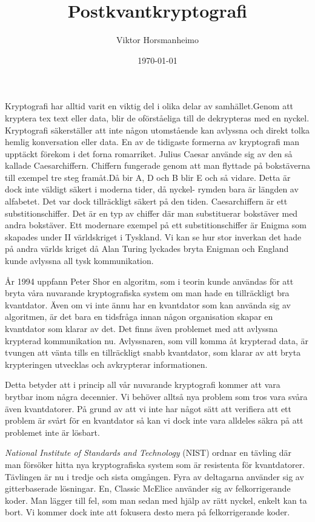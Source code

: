 \documentclass{paper}
\title{Postkvantkryptografi}
\author{Viktor Horsmanheimo}
\date{\today}
\begin{document}
\maketitle

Kryptografi har alltid varit en viktig del i olika delar av samhället.Genom att
kryptera tex text eller data, blir de oförståeliga till de dekrypteras med en
nyckel. Kryptografi säkerställer att inte någon utomstående kan avlyssna och
direkt tolka hemlig konversation eller data. En av de tidigaste formerna av
kryptografi man upptäckt förekom i det forna romarriket. Julius Caesar använde
sig av den så kallade Caesarchiffern. Chiffern fungerade genom att man flyttade
på bokstäverna till exempel tre steg framåt.Då bir A, D och B blir E och så
vidare. Detta är dock inte väldigt säkert i moderna tider, då nyckel- rymden
bara är längden av alfabetet. Det var dock tillräckligt säkert på den tiden.
Caesarchiffern är ett substitionschiffer. Det är en typ av chiffer där man
substituerar bokstäver med andra bokstäver. Ett modernare exempel på ett
substitionschiffer är Enigma som skapades under II världskriget i Tyskland. Vi
kan se hur stor inverkan det hade på andra världs kriget då Alan Turing
lyckades bryta Enigman och England kunde avlyssna all tysk kommunikation.

År 1994 uppfann Peter Shor en algoritm, som i teorin kunde användas för att
bryta våra nuvarande kryptografiska system om man hade en tillräckligt bra
kvantdator. Även om vi inte ännu har en kvantdator som kan använda sig av
algoritmen, är det bara en tidsfråga innan någon organisation skapar en
kvantdator som klarar av det. Det finns även problemet med att avlyssna
krypterad kommunikation nu. Avlyssnaren, som vill komma åt krypterad data, är
tvungen att vänta tills en tillräckligt snabb kvantdator, som klarar av att
bryta krypteringen utvecklas och avkrypterar informationen.

Detta betyder att i princip all vår nuvarande kryptografi kommer att vara
brytbar inom några decennier. Vi behöver alltså nya problem som tros vara svåra
även kvantdatorer. På grund av att vi inte har något sätt att verifiera att ett
problem är svårt för en kvantdator så kan vi dock inte vara alldeles säkra på
att problemet inte är lösbart.

\textit{National Institute of Standards and Technology} (NIST) ordnar en
tävling där man försöker hitta nya kryptografiska system som är resistenta för
kvantdatorer. Tävlingen är nu i tredje och sista omgången. Fyra av deltagarna
använder sig av gitterbaserade lösningar. En, Classic McElice använder sig av
felkorrigerande koder. Man lägger till fel, som man sedan med hjälp av rätt
nyckel, enkelt kan ta bort. Vi kommer dock inte att fokusera desto mera på
felkorrigerande koder.
\end{document}
